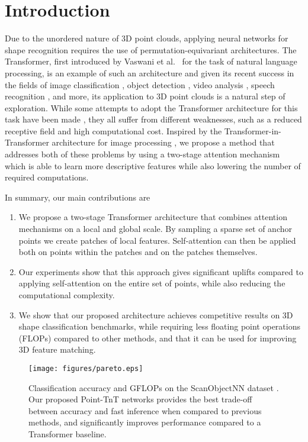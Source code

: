 \documentclass[a4paper,conference]{IEEEtran}
\begin{document}
\section{Introduction}
Due to the unordered nature of 3D point clouds, applying neural networks for shape recognition requires the use of permutation-equivariant architectures. The Transformer, first introduced by Vaswani et al.\ \cite{vaswani2017attention} for the task of natural language processing, is an example of such an architecture and given its recent success in the fields of image classification \cite{dosovitskiy2021image, touvron2021training}, object detection \cite{carion2020end}, video analysis \cite{neimark2021video}, speech recognition \cite{gulati2020conformer, chen2021developing, liu2021tera, berg21_interspeech}, and more, its application to 3D point clouds is a natural step of exploration. While some attempts to adopt the Transformer architecture for this task have been made \cite{lee2019set, zhao2021point, guo2021pct}, they all suffer from different weaknesses, such as a reduced receptive field and high computational cost. Inspired by the Transformer-in-Transformer architecture for image processing \cite{han2021transformer}, we propose a method that addresses both of these problems by using a two-stage attention mechanism which is able to learn more descriptive features while also lowering the number of required computations.

In summary, our main contributions are

\begin{enumerate}
\item We propose a two-stage Transformer architecture that combines attention mechanisms on a local and global scale. By sampling a sparse set of anchor points we create patches of local features. Self-attention can then be applied both on points within the patches and on the patches themselves.
\item Our experiments show that this approach gives significant uplifts compared to applying self-attention on the entire set of points, while also reducing the computational complexity.
\item We show that our proposed architecture achieves competitive results on 3D shape classification benchmarks, while requiring less floating point operations (FLOPs) compared to other methods, and that it can be used for improving 3D feature matching.
\end{enumerate}

\begin{figure}
\center
\texttt{[image: figures/pareto.eps]}
\caption{Classification accuracy and GFLOPs on the ScanObjectNN dataset \cite{uy2019revisiting}. Our proposed Point-TnT networks provides the best trade-off between accuracy and fast inference when compared to previous methods, and significantly improves performance compared to a Transformer baseline.}
\label{pareto}
\end{figure}
\end{document}
